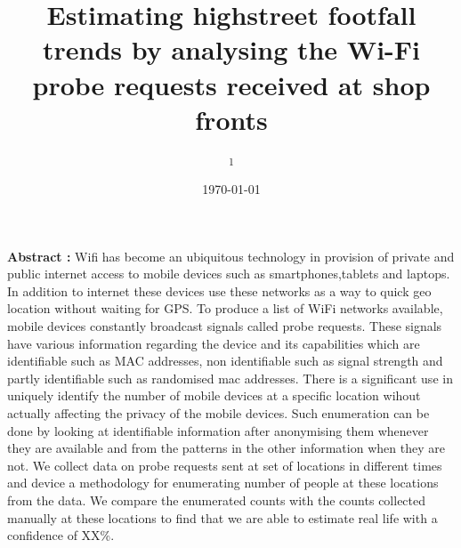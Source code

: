 \documentclass[11t, a4paper, twocolumn]{article}
\title{Estimating highstreet footfall trends by analysing the Wi-Fi probe
requests received at shop fronts}
\author{
	\authorstyle{
		Balamurugan Soundararaj\textsuperscript{1}, 
		James Cheshire\textsuperscript{1} and 
		Paul Longley\textsuperscript{1}}
	\newline\newline
	\textsuperscript{1}\institution{
		Department of Geography, 
		University College London, 
		United Kingdom}
}
\date{\today}
\begin{document}

	\maketitle
	\thispagestyle{firstpage}

	\textbf{Abstract : }
	Wifi has become an ubiquitous technology in provision of private and public 
	internet access to mobile devices such as smartphones,tablets and laptops.
	In addition to internet these devices use these networks as a way to quick 
	geo location without waiting for GPS.
	To produce a list of WiFi networks available, mobile devices constantly 
	broadcast signals called probe requests.
	These signals have various information regarding the device and its 
	capabilities which are identifiable such as MAC addresses, non identifiable 
	such as signal strength and partly identifiable such as randomised mac 
	addresses.
	There is a significant use in uniquely identify the number of mobile devices
	at a specific location wihout actually affecting the privacy of the mobile
	devices.
	Such enumeration can be done by looking at identifiable information after 
	anonymising them whenever they are available and from the patterns in the 
	other information when they are not.
	We collect data on probe requests sent at set of locations in 
	different times and device a methodology for enumerating number of people
	at these locations from the data.
	We compare the enumerated counts with the counts collected manually at
	these locations to find that we are able to estimate real life with a 
	confidence of XX\%.
	
\end{document}
